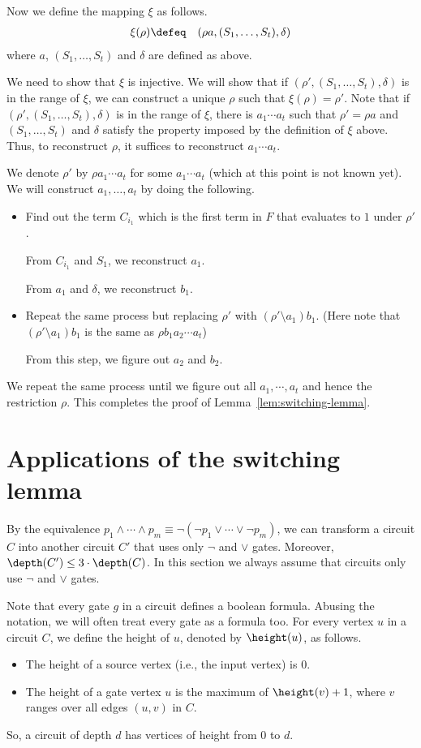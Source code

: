 \documentclass[11pt, a4paper]{article}
\begin{document}
Now we define the mapping $\xi$ as follows.
\begin{eqnarray*}
\xi (\rho) & \defeq & (\rho a, (S_1,\ldots,S_t),\delta)
\end{eqnarray*}
where $a$, $(S_1,\ldots,S_t)$ and $\delta$ are defined as above.

We need to show that $\xi$ is injective.
We will show that if $(\rho',(S_1,\ldots,S_t),\delta)$ is in the range of $\xi$,
we can construct a unique $\rho$ such that $\xi(\rho)=\rho'$.
Note that if $(\rho',(S_1,\ldots,S_t),\delta)$ is in the range of $\xi$,
there is $a_1\cdots a_t$ such that $\rho'=\rho a$
and $(S_1,\ldots,S_t)$ and $\delta$ satisfy the property imposed by the definition of $\xi$ above.
Thus, to reconstruct $\rho$, it suffices to reconstruct $a_1\cdots a_t$.

We denote $\rho'$ by $\rho a_1\cdots a_t$ for some $a_1\cdots a_t$ (which at this point is not known yet).
We will construct $a_1,\ldots,a_t$ by doing the following.
\begin{itemize}
\item
Find out the term $C_{i_1}$ which is
the first term in $F$ that evaluates to $1$ under $\rho'$.

From $C_{i_1}$ and $S_1$, we reconstruct $a_1$.

From $a_1$ and $\delta$, we reconstruct $b_1$.
\item
Repeat the same process but replacing $\rho'$ with $(\rho'\setminus a_1)b_1$.
(Here note that $(\rho'\setminus a_1)b_1$ is the same as $\rho b_1 a_2\cdots a_t$)

From this step, we figure out $a_2$ and $b_2$.
\end{itemize}
We repeat the same process until we figure out all $a_1,\cdots,a_t$
and hence the restriction $\rho$.
This completes the proof of Lemma~\ref{lem:switching-lemma}.
\QED

\section{Applications of the switching lemma}

By the equivalence $p_1\wedge \cdots \wedge p_m \equiv \neg (\neg p_1 \vee \cdots \vee \neg p_m)$,
we can transform a circuit $C$ into another circuit $C'$ that uses only $\neg$ and $\vee$ gates.
Moreover, $\depth(C')\leq 3\cdot \depth(C)$.
In this section we always assume that circuits only use $\neg$ and $\vee$ gates.

Note that every gate $g$ in a circuit defines a boolean formula.
Abusing the notation, we will often treat every gate as a formula too.
For every vertex $u$ in a circuit $C$, we define the height of $u$, denoted by $\height(u)$, as follows.
\begin{itemize}
\item
The height of a source vertex (i.e., the input vertex) is $0$.
\item 
The height of a gate vertex $u$ is the maximum of $\height(v)+1$,
where $v$ ranges over all edges $(u,v)$ in $C$.
\end{itemize}
So, a circuit of depth $d$ has vertices of height from $0$ to $d$.
\end{document}
